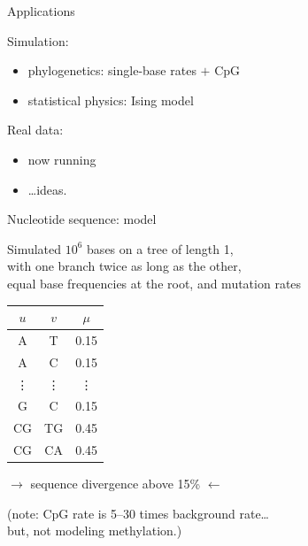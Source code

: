 \documentclass[smaller]{beamer}
\begin{document}
\begin{frame}{Applications}

  Simulation:
  \begin{itemize}
    \item phylogenetics: single-base rates $+$ CpG 
    \item statistical physics: Ising model
  \end{itemize}

  \vspace{3em}

  Real data:
  \begin{itemize}
    \item now running
    \item \ldots ideas.
  \end{itemize}

\end{frame}

\begin{frame}{Nucleotide sequence: model}

  Simulated $10^6$ bases on a tree of length 1, \\
  with one branch twice as long as the other,\\
  equal base frequencies at the root,
  and mutation rates
  {\small
  \begin{center}
    \begin{tabular}{c@{\quad$\to$\quad}c@{\quad at rate\quad }c}
      $u$  &  $v$  &  $\mu$  \\
      \hline
       A & T   &  0.15  \\
       A & C   &  0.15  \\
       \vdots & \vdots & \vdots \\
       G & C &  0.15  \\
      CG   &  TG   &  0.45 \\
      CG   &  CA   &  0.45 
    \end{tabular}
  \end{center}
  }

  \vspace{2em}

  $\longrightarrow$ sequence divergence above 15\% $\longleftarrow$
  
  \vspace{2em}

  ({\struct note:} CpG rate is 5--30 times background rate\ldots\\
  \hspace{3em} but, not modeling methylation.)

\end{frame}
\end{document}
